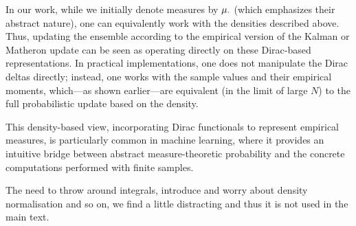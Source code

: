 \documentclass[wcp]{jmlr} %
\begin{document}
In our work, while we initially denote measures by \(\Law[\cdot]\) (which emphasizes their abstract nature), one can equivalently work with the densities described above.
Thus, updating the ensemble according to the empirical version of the Kalman or Matheron update can be seen as operating directly on these Dirac-based representations.
In practical implementations, one does not manipulate the Dirac deltas directly; instead, one works with the sample values and their empirical moments, which—as shown earlier—are equivalent (in the limit of large \(N\)) to the full probabilistic update based on the density.

This density-based view, incorporating Dirac functionals to represent empirical measures, is particularly common in machine learning, where it provides an intuitive bridge between abstract measure-theoretic probability and the concrete computations performed with finite samples.

The need to throw around integrals, introduce and worry about density normalisation and so on, we find a little distracting and thus it is not used in the main text.


\end{document}
